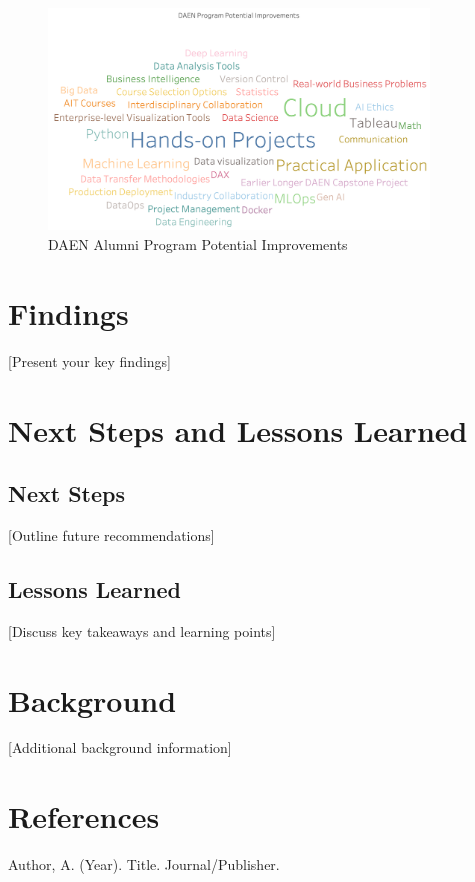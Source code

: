 \documentclass[12pt,a4paper]{article}
\begin{document}
\begin{figure}[H]
    \centering
    \includegraphics[width=0.9\textwidth]{visualizations/potential-improvements.png}
    \caption{DAEN Alumni Program Potential Improvements}
    \label{fig:potential-improvements}
\end{figure}

\section{Findings}
[Present your key findings]

\section{Next Steps and Lessons Learned}
\subsection{Next Steps}
[Outline future recommendations]

\subsection{Lessons Learned}
[Discuss key takeaways and learning points]

\begin{appendices}
\section{Background}
[Additional background information]

\section{References}
\begin{thebibliography}{9}
     Author, A. (Year). Title. Journal/Publisher.
\end{thebibliography}
\end{appendices}
\end{document}
